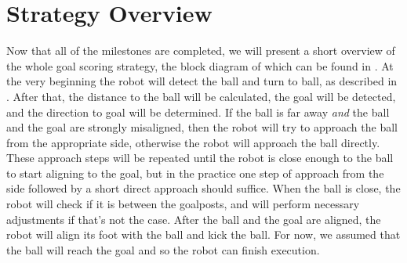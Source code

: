 \section{Strategy Overview}

Now that all of the milestones are completed, we will present a short overview
of the whole goal scoring strategy, the block diagram of which can be found in
. At the very beginning the robot
will detect the ball and turn to ball, as described in . After
that, the distance to the ball will be calculated, the goal will be detected,
and the direction to goal will be determined. If the ball is far away
\textit{and} the ball and the goal are strongly misaligned, then the robot will
try to approach the ball from the appropriate side, otherwise the robot will
approach the ball directly. These approach steps will be repeated until the
robot is close enough to the ball to start aligning to the goal, but in the
practice one step of approach from the side followed by a short direct approach
should suffice. When the ball is close, the robot will check if it is between
the goalposts, and will perform necessary adjustments if that's not the case.
After the ball and the goal are aligned, the robot will align its foot with
the ball and kick the ball. For now, we assumed that the ball will reach the
goal and so the robot can finish execution.
